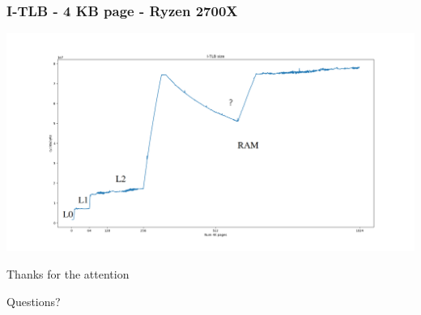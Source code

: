 \documentclass{beamer}
\begin{document}
\begin{frame}
\frametitle{I-TLB - 4 KB page - Ryzen 2700X}
\includegraphics[scale=.18]{img/itlb_size_zen.png}
\end{frame}

\begin{frame}
\Huge{\centerline{Thanks for the attention}}
\Huge{\centerline{Questions?}}
\end{frame}

\end{document}
